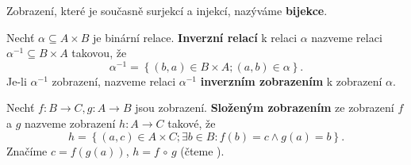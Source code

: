 \begin{definition}
  Zobrazení, které je současně surjekcí a injekcí, nazýváme \textbf{bijekce}.
\end{definition}

\begin{definition}
  Nechť $\alpha \subseteq A\times B$ je binární relace. \textbf{Inverzní relací} k relaci $\alpha$ nazveme relaci $\alpha^{-1} \subseteq B\times A$ takovou, že
  \[
    \alpha^{-1}=\left\{ (b,a)\in B\times A;  (a,b)\in \alpha\right\}.
  \]
  Je-li $\alpha^{-1}$ zobrazení, nazveme relaci $\alpha ^{-1}$ \textbf{inverzním zobrazením} k zobrazení $\alpha$.
\end{definition}

\begin{definition}
  Nechť $f:B\to C, g:A\to B$ jsou zobrazení. \textbf{Složeným zobrazením} ze zobrazení $f$ a $g$ nazveme zobrazení $h: A\to C$ takové, že
  \[
    h=\left\{ (a,c)\in A\times C;\exists b\in B: f(b)=c \land g(a)=b \right\}.
  \]
  Značíme $c=f(g(a))$, $h=f\, \circ \, g $ (čteme ).
\end{definition}
